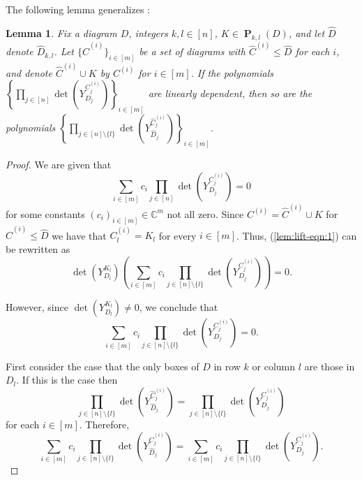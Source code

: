 \documentclass{amsart}
\newtheorem{lemma}[theorem]{Lemma}
\theoremstyle{definition}
\theoremstyle{named}
\newcommand*{\C}{\mathbb{C}}
\DeclareMathOperator*{\Purple}{\mathbf{P}}
\begin{document}
The following lemma generalizes \cite[Lemma 5.7]{zeroone}:
\begin{lemma} \label{lem:lift}
Fix a diagram $D$, integers $k, l \in [n]$, $K \in \Purple_{k, l}(D)$, and let $\widehat{D}$ denote $\widehat{D}_{k, l}$. Let $\{\widehat{C}^{(i)}\}_{i \in [m]}$ be a set of diagrams with $\widehat{C}^{(i)} \le \widehat{D}$ for each $i$, and denote $\widehat{C}^{(i)} \cup K$ by $C^{(i)}$ for $i \in [m]$. If the polynomials $\left\{ \displaystyle\prod_{j \in [n]} \det(Y^{C^{(i)}_j}_{D_j}) \right\}_{i \in [m]}$ are linearly dependent, then so are the polynomials $\left\{ \displaystyle\prod_{j \in [n] \setminus \{l\}} \det(Y^{\widehat{C}^{(i)}_j}_{\widehat{D}_j}) \right\}_{i \in [m]}$.
\end{lemma}
\begin{proof}
We are given that
\begin{equation} \label{lem:lift-eqn:1}
\sum_{i \in [m]} c_i \prod_{j \in [n]} \det(Y^{C^{(i)}_j}_{D_j}) = 0
\end{equation}
for some constants $(c_i)_{i \in [m]} \in \C^m$ not all zero. Since $C^{(i)} = \widehat{C}^{(i)} \cup K$ for $\widehat{C}^{(i)} \le \widehat{D}$ we have that $C^{(i)}_l = K_l$ for every $i \in [m]$. Thus, (\ref{lem:lift-eqn:1}) can be rewritten as
\begin{equation}
\det(Y^{K_l}_{D_l}) \left( \sum_{i \in [m]} c_i \prod_{j \in [n] \setminus \{l\}} \det(Y^{C^{(i)}_j}_{D_j}) \right) = 0.
\end{equation}

However, since $\det(Y^{K_l}_{D_l}) \ne 0$, we conclude that
\begin{equation} \label{lem:lift-eqn:3}
\sum_{i \in [m]} c_i \prod_{j \in [n] \setminus \{l\}} \det(Y^{C^{(i)}_j}_{D_j}) = 0.
\end{equation}

First consider the case that the only boxes of $D$ in row $k$ or column $l$ are those in $D_l$. If this is the case then
\begin{equation} 
\prod_{j \in [n] \setminus \{l\}} \det(Y^{\widehat{C}^{(i)}_j}_{\widehat{D}_j}) = \prod_{j \in [n] \setminus \{l\}} \det(Y^{C^{(i)}_j}_{D_j})
\end{equation}
for each $i \in [m]$. Therefore,
\begin{equation} \label{lem:lift-eqn:5}
\sum_{i \in [m]} c_i \prod_{j \in [n] \setminus \{l\}} \det(Y^{\widehat{C}^{(i)}_j}_{\widehat{D}_j}) = \sum_{i \in [m]} c_i \prod_{j \in [n] \setminus \{l\}} \det(Y^{C^{(i)}_j}_{D_j}).
\end{equation}


\end{proof}
\end{document}
